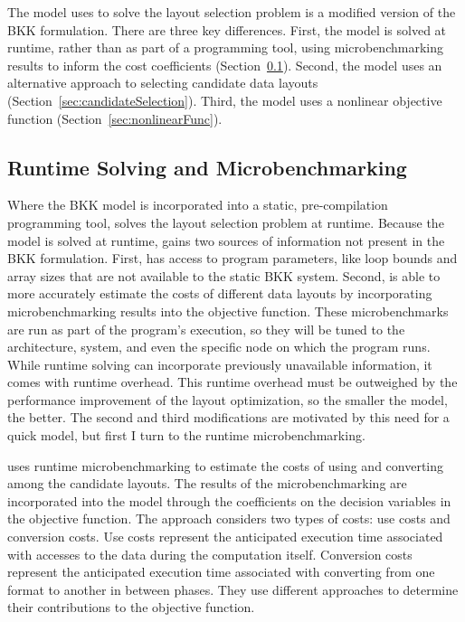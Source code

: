 The model \FormatDecisions{} uses to solve the layout selection problem is a modified version of the BKK formulation.
There are three key differences.
First, the model is solved at runtime, rather than as part of a programming tool, using microbenchmarking results to inform the cost coefficients (Section~\ref{sec:microbenchmarking}).
Second, the model uses an alternative approach to selecting candidate data layouts (Section~\ref{sec:candidateSelection}).
Third, the model uses a nonlinear objective function (Section~\ref{sec:nonlinearFunc}).

\subsection{Runtime Solving and Microbenchmarking}\label{sec:microbenchmarking}

Where the BKK model is incorporated into a static, pre-compilation programming tool, \FormatDecisions{} solves the layout selection problem at runtime.
Because the model is solved at runtime, \FormatDecisions{} gains two sources of information not present in the BKK formulation.
First, \FormatDecisions{} has access to program parameters, like loop bounds and array sizes that are not available to the static BKK system.
Second, \FormatDecisions{} is able to more accurately estimate the costs of different data layouts by incorporating microbenchmarking results into the objective function.
These microbenchmarks are run as part of the program's execution, so they will be tuned to the architecture, system, and even the specific node on which the program runs.
While runtime solving can incorporate previously unavailable information, it comes with runtime overhead.
This runtime overhead must be outweighed by the performance improvement of the layout optimization, so the smaller the model, the better.
The second and third modifications are motivated by this need for a quick model, but first I turn to the runtime microbenchmarking.

\FormatDecisions{} uses runtime microbenchmarking to estimate the costs of using and converting among the candidate layouts. 
The results of the microbenchmarking are incorporated into the model through the coefficients on the decision variables in the objective function.
The approach considers two types of costs: use costs and conversion costs.
Use costs represent the anticipated execution time associated with accesses to the data during the computation itself.
Conversion costs represent the anticipated execution time associated with converting from one format to another in between phases.
They use different approaches to determine their contributions to the objective function.

